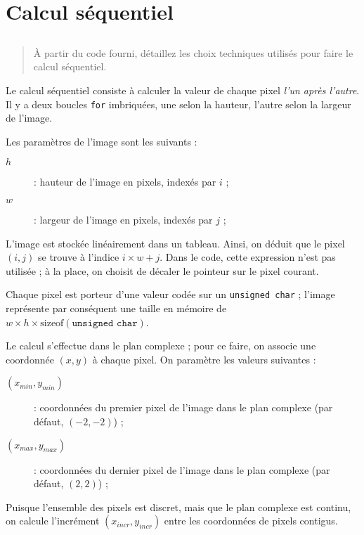 \section{Calcul séquentiel}


\subsection{}

\begin{quotation}
  \noindent À partir du code fourni, détaillez les choix techniques
  utilisés pour faire le calcul séquentiel.
\end{quotation}

Le calcul séquentiel consiste à calculer la valeur de chaque pixel
\emph{l'un après l'autre}. Il y a deux boucles \texttt{for}
imbriquées, une selon la hauteur, l'autre selon la largeur de l'image.

Les paramètres de l'image sont les suivants :

\begin{description}
\item[$h$] : hauteur de l'image en pixels, indexés par $i$ ;
\item[$w$] : largeur de l'image en pixels, indexés par $j$ ;
\end{description}

L'image est stockée linéairement dans un tableau. Ainsi, on déduit que
le pixel $(i, j)$ se trouve à l'indice $i \times w + j$. Dans le code, cette
expression n'est pas utilisée ; à la place, on choisit de décaler le
pointeur sur le pixel courant.

Chaque pixel est porteur d'une valeur codée sur un \texttt{unsigned
  char} ; l'image représente par conséquent une taille en mémoire de
$w \times h \times \mathrm{sizeof}(\texttt{unsigned char})$.

Le calcul s'effectue dans le plan complexe ; pour ce faire, on associe
une coordonnée $(x, y)$ à chaque pixel. On paramètre les valeurs
suivantes :

\begin{description}
\item[$(x_{min}, y_{min})$] : coordonnées du premier pixel de l'image
  dans le plan complexe (par défaut, $(-2, -2)$) ;
\item[$(x_{max}, y_{max})$] : coordonnées du dernier pixel de l'image
  dans le plan complexe (par défaut, $(2, 2)$) ;
\end{description}

Puisque l'ensemble des pixels est discret, mais que le plan complexe
est continu, on calcule l'incrément $(x_{incr}, y_{incr})$ entre les
coordonnées de pixels contigus.


